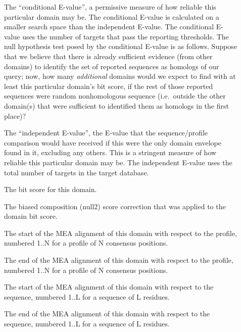 \begin{description}
\item[] The ``conditional E-value'', a
  permissive measure of how reliable this particular domain may be.
  The conditional E-value is calculated on a smaller search space than
  the independent E-value. The conditional E-value uses the number of
  targets that pass the reporting thresholds. The null hypothesis test
  posed by the conditional E-value is as follows. Suppose that we
  believe that there is already sufficient evidence (from other
  domains) to identify the set of reported sequences as homologs of
  our query; now, how many \emph{additional} domains would we expect
  to find with at least this particular domain's bit score, if the
  rest of those reported sequences were random nonhomologous sequence
  (i.e.\ outside the other domain(s) that were sufficient to
  identified them as homologs in the first place)?

\item[] The ``independent E-value'', the
  E-value that the sequence/profile comparison would have received if
  this were the only domain envelope found in it, excluding any
  others. This is a stringent measure of how reliable this particular
  domain may be. The independent E-value uses the total number of
  targets in the target database.

\item[] The bit score for this domain.

\item[] The biased composition (null2) score
  correction that was applied to the domain bit score.

\item[]
  The start of the MEA alignment of this domain with respect to the
  profile, numbered 1..N for a profile of N consensus positions.

\item[]
  The end of the MEA alignment of this domain with respect to the
  profile, numbered 1..N for a profile of N consensus positions.

\item[]
  The start of the MEA alignment of this domain with respect to the
  sequence, numbered 1..L for a sequence of L residues.
 
\item[]
  The end of the MEA alignment of this domain with respect to the
  sequence, numbered 1..L for a sequence of L residues.


\end{description}
